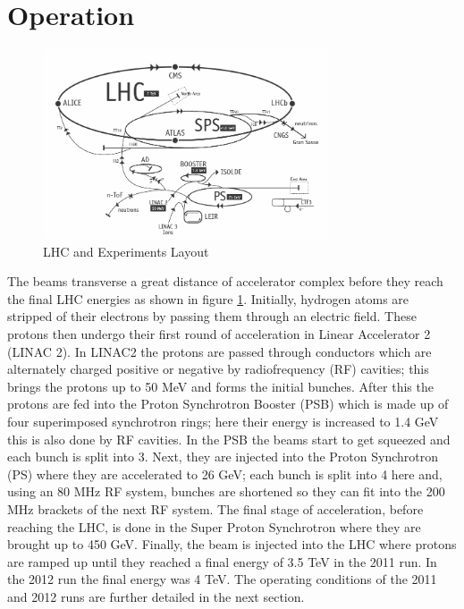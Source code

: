 \section{Operation}

\begin{figure}[t]
  \centering
	\includegraphics[width=0.75\textwidth]{images/LHCLayout.png}
  	\caption[e/$\gamma$ LHC Layout]
   	{LHC and Experiments Layout}
	\label{fig:LHCRings}
\end{figure}
The beams transverse a great distance of accelerator complex %
before they reach the final LHC energies as shown in figure \ref{fig:LHCRings}.%
Initially, hydrogen atoms are stripped of their electrons by passing them
through an electric field. These protons
then undergo their first round of acceleration in Linear Accelerator 2 (LINAC 2).
In LINAC2 the protons are passed through conductors which
are alternately charged positive or negative by radiofrequency (RF) cavities;
this brings the protons up to 50 MeV and forms the initial bunches. 
After this the protons are
fed into the Proton Synchrotron Booster (PSB) which is made up 
of four superimposed synchrotron rings; here their energy
is increased to 1.4 GeV this is also done by RF cavities. In
the PSB the beams start to get squeezed and each bunch is 
split into 3. 
Next, they are injected into the Proton
Synchrotron (PS) where they are accelerated to 26 GeV; each
bunch is split into 4 here and, using an 80 MHz RF system,
bunches are shortened so they can fit into the 200 MHz brackets
of the next RF system. The final
stage of acceleration, before reaching the LHC, is done in the
Super Proton Synchrotron where they are brought up to 450 GeV.
Finally, the beam is injected into the LHC where protons are ramped
up until they reached a final energy of 3.5 TeV 
in the 2011 run. In the 2012 run the final energy was 4 TeV. 
The operating conditions of the 2011 and 2012 runs are further
detailed in the next section.

